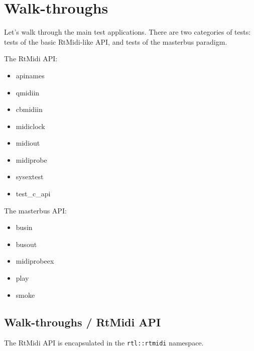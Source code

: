 %
%
%

\section{Walk-throughs}
\label{sec:walkthroughs}

   Let's walk through the main test applications. There are two categories of
   tests: tests of the basic RtMidi-like API, and tests of the masterbus
   paradigm.

   The RtMidi API:

   \begin{itemize}
      \item apinames
      \item qmidiin
      \item cbmidiin
      \item midiclock
      \item midiout
      \item midiprobe
      \item sysextest
      \item test\_c\_api
   \end{itemize}

   The masterbus API:

   \begin{itemize}
      \item busin
      \item busout
      \item midiprobeex
      \item play
      \item smoke
   \end{itemize}

\subsection{Walk-throughs / RtMidi API}
\label{subsec:walkthroughs_rtmidi_api}

   The RtMidi API is encapsulated in the
   \texttt{rtl::rtmidi} namespace.


